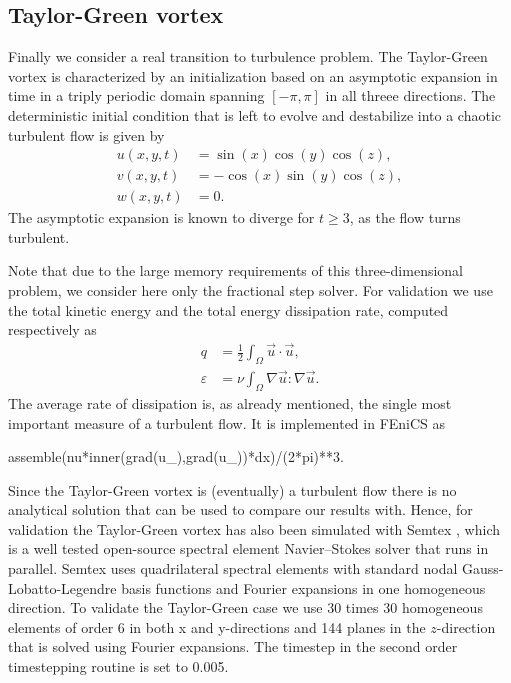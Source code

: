 \subsection{Taylor-Green vortex} 
\label{sec:mortensen:TG}
Finally we consider a real transition to turbulence problem. The Taylor-Green vortex is characterized by an initialization based on an asymptotic expansion in time in a triply periodic domain spanning $[-\pi,\pi]$ in all threee directions. The deterministic initial condition that is left to evolve and destabilize into a chaotic turbulent flow is given by
\begin{align}
 u(x,y,t)&=\sin(x)\cos(y)\cos(z),\\
 v(x,y,t)&=-\cos(x)\sin(y)\cos(z),\\
 w(x,y,t)&=0.
\end{align}
The asymptotic expansion is known to diverge for $t \ge 3$, as the flow turns turbulent.

Note that due to the large memory requirements of this three-dimensional problem, we consider here only the fractional step solver. For validation we use the total kinetic energy and the total energy dissipation rate, computed respectively as
\begin{align}
 q &= \frac{1}{2} \int_{\Omega} \vec{u} \cdot \vec{u}, \label{eq:mortensen:q} \\
 \varepsilon &= \nu \int_{\Omega} \nabla \vec{u}: \nabla \vec{u}. \label{eq:mortensen:diss}
\end{align}
The average rate of dissipation is, as already mentioned, the single most important measure of a turbulent flow. It is implemented in FEniCS as
\begin{python}
   assemble(nu*inner(grad(u_),grad(u_))*dx)/(2*pi)**3.
\end{python}

Since the Taylor-Green vortex is (eventually) a turbulent flow there is no analytical solution that can be used to compare our results with. Hence, for validation the Taylor-Green vortex has also been simulated with Semtex \cite{Semtex}, which is a well tested open-source spectral element Navier--Stokes solver that runs in parallel. Semtex uses quadrilateral spectral elements with standard nodal Gauss-Lobatto-Legendre basis functions and Fourier expansions in one homogeneous direction. To validate the Taylor-Green case we use 30 times 30 homogeneous elements of order 6 in both x and y-directions and 144 planes in the $z$-direction that is solved using Fourier expansions. The timestep in the second order timestepping routine is set to 0.005.

